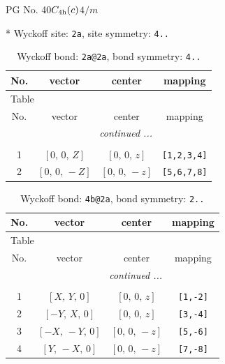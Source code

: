 \documentclass[fleqn,8pt]{jsarticle}
\begin{document}
\setcounter{MaxMatrixCols}{32}

\renewcommand{\tablename}{Table~}
\renewcommand{\figurename}{Figure~}
\begin{center}
\LARGE
PG No. 40\quad$C_{\rm 4h}(c)$\quad$4/m$\quad[ tetragonal ]
\end{center}


* Wyckoff site: {\tt 2a}, site symmetry: {\tt 4..}
\renewcommand{\arraystretch}{1.2}
\begin{longtable}{cccc}
\caption{Wyckoff bond: {\tt 2a@2a}, bond symmetry: {\tt 4..}}
 \\
 \hline \hline
No. & vector & center & mapping \\ \hline \endfirsthead

\multicolumn{3}{l}{\tablename\ \thetable{}} \\
 \hline \hline
No. & vector & center & mapping \\ \hline \endhead

 \hline \hline
\multicolumn{3}{r}{\footnotesize\it continued ...} \\ \endfoot

 \hline \hline
\multicolumn{3}{r}{} \\ \endlastfoot

1 & $\left[ 0,\, 0,\, Z \right]$ & $\left[ 0,\, 0,\, z \right]$ & {\tt [1,2,3,4]} \\ \hline
2 & $\left[ 0,\, 0,\, - Z \right]$ & $\left[ 0,\, 0,\, - z \right]$ & {\tt [5,6,7,8]} \\
\end{longtable}
\renewcommand{\arraystretch}{1.2}
\begin{longtable}{cccc}
\caption{Wyckoff bond: {\tt 4b@2a}, bond symmetry: {\tt 2..}}
 \\
 \hline \hline
No. & vector & center & mapping \\ \hline \endfirsthead

\multicolumn{3}{l}{\tablename\ \thetable{}} \\
 \hline \hline
No. & vector & center & mapping \\ \hline \endhead

 \hline \hline
\multicolumn{3}{r}{\footnotesize\it continued ...} \\ \endfoot

 \hline \hline
\multicolumn{3}{r}{} \\ \endlastfoot

1 & $\left[ X,\, Y,\, 0 \right]$ & $\left[ 0,\, 0,\, z \right]$ & {\tt [1,-2]} \\ \hline
2 & $\left[ - Y,\, X,\, 0 \right]$ & $\left[ 0,\, 0,\, z \right]$ & {\tt [3,-4]} \\ \hline
3 & $\left[ - X,\, - Y,\, 0 \right]$ & $\left[ 0,\, 0,\, - z \right]$ & {\tt [5,-6]} \\ \hline
4 & $\left[ Y,\, - X,\, 0 \right]$ & $\left[ 0,\, 0,\, - z \right]$ & {\tt [7,-8]} \\
\end{longtable}
\end{document}
